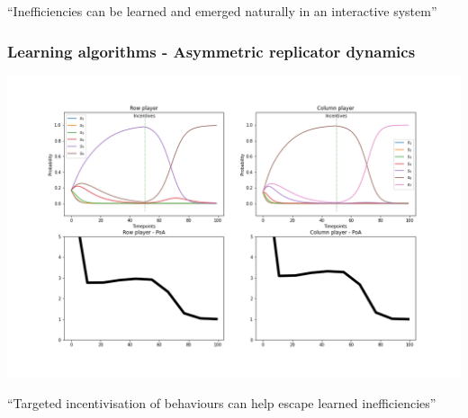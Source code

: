 \begin{frame}
    \centering
    \Huge{
    ``Inefficiencies can be learned and emerged naturally in an interactive system''
    }
\end{frame}


\begin{frame}
    \frametitle{Learning algorithms - Asymmetric replicator dynamics}

    \includegraphics[scale=0.28]{Bin/ARD_penalty_game.png}
    
\end{frame}


\begin{frame}
    \centering
    \Huge{
    ``Targeted incentivisation of behaviours can help escape learned inefficiencies''
    }
\end{frame}
